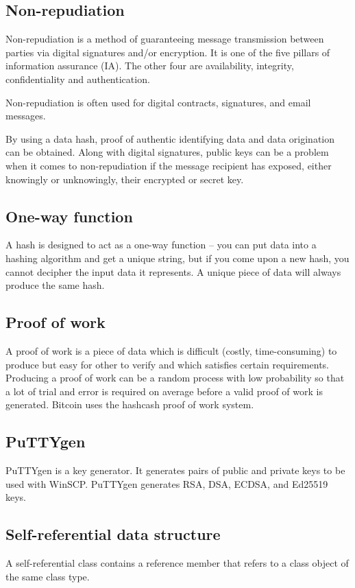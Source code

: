 \documentclass{article}
\begin{document}
\subsection{Non-repudiation}
Non-repudiation is a method of guaranteeing message transmission between
parties via digital signatures and/or encryption. It is one of the five pillars
of information assurance (IA). The other four are availability, integrity,
confidentiality and authentication.

Non-repudiation is often used for digital contracts, signatures, and email
messages.

By using a data hash, proof of authentic identifying data and data origination
can be obtained. Along with digital signatures, public keys can be a problem
when it comes to non-repudiation if the message recipient has exposed, either
knowingly or unknowingly, their encrypted or secret key.

\subsection{One-way function}
A hash is designed to act as a one-way function -- you can put data into a
hashing algorithm and get a unique string, but if you come upon a new hash,
you cannot decipher the input data it represents. A unique piece of data will
always produce the same hash.

\subsection{Proof of work}
A proof of work is a piece of data which is difficult (costly, time-consuming)
to produce but easy for other to verify and which satisfies certain
requirements. Producing a proof of work can be a random process with low
probability so that a lot of trial and error is required on average before a
valid proof of work is generated. Bitcoin uses the hashcash proof of work
system.

\subsection{PuTTYgen}
PuTTYgen is a key generator. It generates pairs of public and private keys to
be used with WinSCP. PuTTYgen generates RSA, DSA, ECDSA, and Ed25519 keys.

\subsection{Self-referential data structure}
A self-referential class contains a reference member that refers to a class
object of the same class type.
\end{document}

